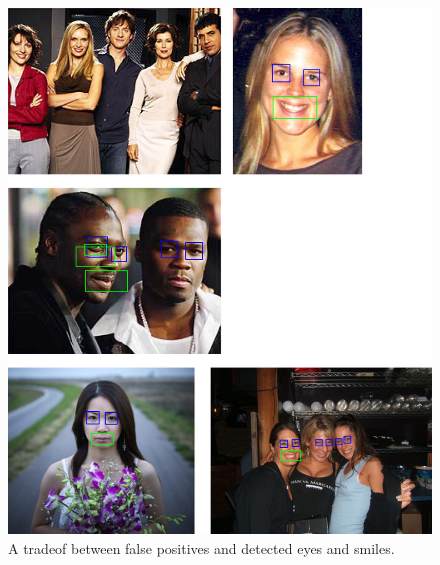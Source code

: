\documentclass[11pt, a4paper, twocolumn]{article}
\begin{document}
\begin{figure}[h]
 \includegraphics[width=1.0\columnwidth]{images/03_tradeof.png}
 \centering
 \caption{A tradeof between false positives and detected eyes and smiles.}
 \label{fig:03_tradeof}
\end{figure}
\end{document}
